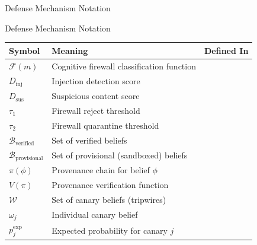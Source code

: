 \documentclass[
  ignorenonframetext,
]{beamer}
\newcounter{none} %
\providecommand{\cref}[1]{\texttt{\detokenize{#1}}}
\begin{document}
\begin{frame}[allowframebreaks]{Defense Mechanism Notation}
\protect{}\label{defense-mechanism-notation}
\end{frame}

\begin{frame}[allowframebreaks]{Defense Mechanism Notation}
{\def\LTcaptype{none} %
\begin{longtable}[]{@{}
  >{\raggedright\arraybackslash}p{}
  >{\raggedright\arraybackslash}p{}
  >{\raggedright\arraybackslash}p{}@{}}
\toprule\noalign{}
\begin{minipage}[b]{\linewidth}\raggedright
Symbol
\end{minipage} & \begin{minipage}[b]{\linewidth}\raggedright
Meaning
\end{minipage} & \begin{minipage}[b]{\linewidth}\raggedright
Defined In
\end{minipage} \\
\midrule\noalign{}
\endhead
\(\mathcal{F}(m)\) & Cognitive firewall classification function &
\cref{def:firewall} \\
\(D_{\text{inj}}\) & Injection detection score &
\cref{def:firewall-rules} \\
\(D_{\text{sus}}\) & Suspicious content score &
\cref{def:firewall-rules} \\
\(\tau_1\) & Firewall reject threshold & \cref{eq:firewall-rules} \\
\(\tau_2\) & Firewall quarantine threshold & \cref{eq:firewall-rules} \\
\(\mathcal{B}_{\text{verified}}\) & Set of verified beliefs &
\cref{def:sandbox} \\
\(\mathcal{B}_{\text{provisional}}\) & Set of provisional (sandboxed)
beliefs & \cref{def:sandbox} \\
\(\pi(\phi)\) & Provenance chain for belief \(\phi\) &
\cref{def:evidence} \\
\(V(\pi)\) & Provenance verification function &
\cref{sec:integrity-properties} \\
\(\mathcal{W}\) & Set of canary beliefs (tripwires) &
\cref{def:canary} \\
\(\omega_j\) & Individual canary belief & \cref{eq:canary-set} \\
\(p_j^{\text{exp}}\) & Expected probability for canary \(j\) &

\end{longtable}}
\end{frame}
\end{document}
